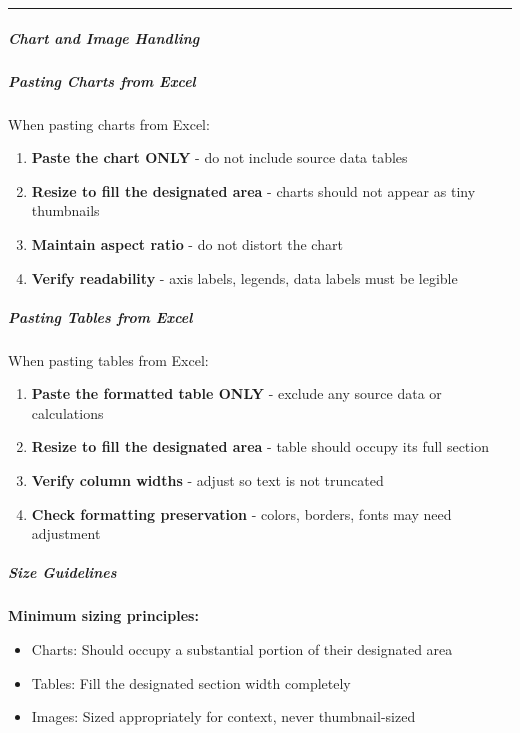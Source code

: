 \documentclass[11pt]{article}
\begin{document}
\vspace{0.5em}\hrule\vspace{0.5em}

\subparagraph{Chart and Image Handling}\mbox{}\par

\subparagraph{Pasting Charts from Excel}\mbox{}\par

When pasting charts from Excel:


\begin{enumerate}[leftmargin=*,itemsep=2pt,topsep=2pt]
\item {} \textbf{Paste the chart ONLY} - do not include source data tables
\item {} \textbf{Resize to fill the designated area} - charts should not appear as tiny thumbnails
\item {} \textbf{Maintain aspect ratio} - do not distort the chart
\item {} \textbf{Verify readability} - axis labels, legends, data labels must be legible
\end{enumerate}

\subparagraph{Pasting Tables from Excel}\mbox{}\par

When pasting tables from Excel:


\begin{enumerate}[leftmargin=*,itemsep=2pt,topsep=2pt]
\item {} \textbf{Paste the formatted table ONLY} - exclude any source data or calculations
\item {} \textbf{Resize to fill the designated area} - table should occupy its full section
\item {} \textbf{Verify column widths} - adjust so text is not truncated
\item {} \textbf{Check formatting preservation} - colors, borders, fonts may need adjustment
\end{enumerate}

\subparagraph{Size Guidelines}\mbox{}\par

\textbf{Minimum sizing principles:}

\begin{itemize}[leftmargin=*,itemsep=2pt,topsep=2pt]
\item {} Charts: Should occupy a substantial portion of their designated area
\item {} Tables: Fill the designated section width completely
\item {} Images: Sized appropriately for context, never thumbnail-sized
\end{itemize}
\end{document}
